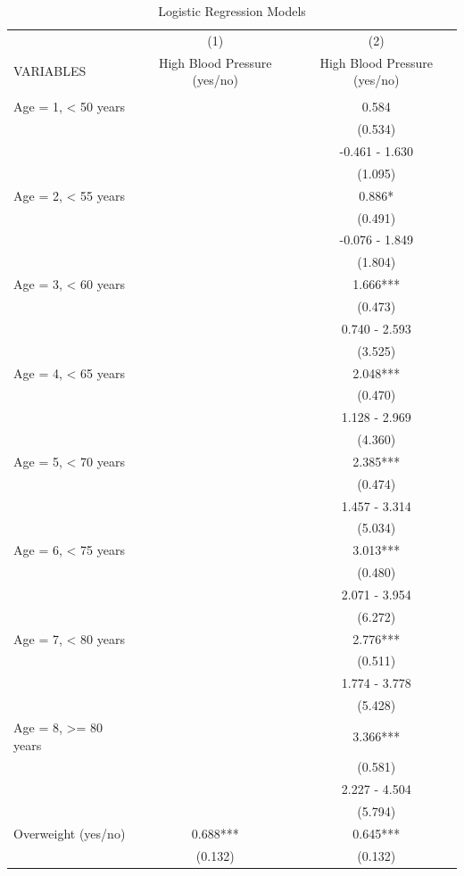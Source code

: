 \documentclass{article}
\begin{document}
\begin{enumerate}[a.]
\begin{table}[!h]
\caption{Logistic Regression Models} 
\begin{center}
\begin{tabular}{lcc} \hline
 & (1) & (2) \\
VARIABLES & High Blood Pressure (yes/no) & High Blood Pressure (yes/no) \\ \hline
 &  &  \\
Age = 1, < 50 years &  & 0.584 \\
 &  & (0.534) \\
 &  & -0.461 - 1.630 \\
 &  & (1.095) \\
Age = 2, < 55 years &  & 0.886* \\
 &  & (0.491) \\
 &  & -0.076 - 1.849 \\
 &  & (1.804) \\
Age = 3, < 60 years &  & 1.666*** \\
 &  & (0.473) \\
 &  & 0.740 - 2.593 \\
 &  & (3.525) \\
Age = 4, < 65 years &  & 2.048*** \\
 &  & (0.470) \\
 &  & 1.128 - 2.969 \\
 &  & (4.360) \\
Age = 5, < 70 years &  & 2.385*** \\
 &  & (0.474) \\
 &  & 1.457 - 3.314 \\
 &  & (5.034) \\
Age = 6, < 75 years &  & 3.013*** \\
 &  & (0.480) \\
 &  & 2.071 - 3.954 \\
 &  & (6.272) \\
Age = 7, < 80 years &  & 2.776*** \\
 &  & (0.511) \\
 &  & 1.774 - 3.778 \\
 &  & (5.428) \\
Age = 8, >= 80 years &  & 3.366*** \\
 &  & (0.581) \\
 &  & 2.227 - 4.504 \\
 &  & (5.794) \\
Overweight (yes/no) & 0.688*** & 0.645*** \\
 & (0.132) & (0.132) \\

\end{tabular}
\end{center}
\end{table}
\end{enumerate}
\end{document}

